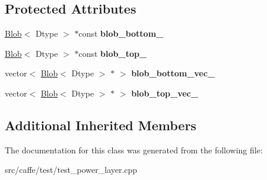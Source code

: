 \subsection*{Protected Attributes}
\begin{DoxyCompactItemize}
\item 
\mbox{\label{classcaffe_1_1_power_layer_test_aafecb53dd0a1da4928b4019ecd9213a9}} 
\mbox{\hyperlink{classcaffe_1_1_blob}{Blob}}$<$ Dtype $>$ $\ast$const {\bfseries blob\+\_\+bottom\+\_\+}
\item 
\mbox{\label{classcaffe_1_1_power_layer_test_ab93cccdb81509768c0ecd1261dbc403e}} 
\mbox{\hyperlink{classcaffe_1_1_blob}{Blob}}$<$ Dtype $>$ $\ast$const {\bfseries blob\+\_\+top\+\_\+}
\item 
\mbox{\label{classcaffe_1_1_power_layer_test_a2bb4f126bcb12baacee6568bb0fd7a20}} 
vector$<$ \mbox{\hyperlink{classcaffe_1_1_blob}{Blob}}$<$ Dtype $>$ $\ast$ $>$ {\bfseries blob\+\_\+bottom\+\_\+vec\+\_\+}
\item 
\mbox{\label{classcaffe_1_1_power_layer_test_a55546c2015cb26961ccc74ac8b5d5f00}} 
vector$<$ \mbox{\hyperlink{classcaffe_1_1_blob}{Blob}}$<$ Dtype $>$ $\ast$ $>$ {\bfseries blob\+\_\+top\+\_\+vec\+\_\+}
\end{DoxyCompactItemize}
\subsection*{Additional Inherited Members}


The documentation for this class was generated from the following file\+:\begin{DoxyCompactItemize}
\item 
src/caffe/test/test\+\_\+power\+\_\+layer.\+cpp\end{DoxyCompactItemize}
